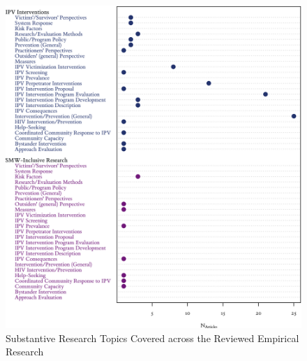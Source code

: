 \documentclass[11pt,]{tufte-book}
\begin{document}
\newpage

\begin{figure}
\centering
\includegraphics{graphics/inputs/topics.png}
\caption{Substantive Research Topics Covered across the Reviewed
Empirical Research\label{fig:topics}}
\end{figure}

\newpage
\end{document}
